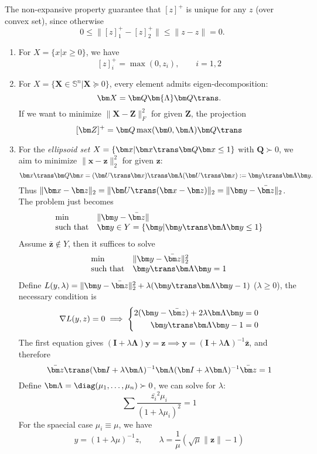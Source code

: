 The non-expansive property guarantee that $[z]^+$ is unique for any $z$ (over convex set), since otherwise
\[
0\le\|[z]^+_1-[z]^+_2\|\le\|z-z\|=0.
\]
\begin{example}
\begin{enumerate}
\item
For $X=\{x|x\ge0\}$, we have
\[
[z]^+_i=\max(0,z_i),\qquad i=1,2
\]
\item
For $X=\{\bm X\in\mathbb{S}^n|\bm X\succeq0\}$, every element admits eigen-decomposition:
\[
\bm X=\bm Q\bm{\Lambda}\bm Q\trans.
\]
If we want to minimize $\|\bm X-\bm Z\|_F^2$ for given $\bm Z$, the projection
\[
[\bm Z]^+=\bm Q\max(\bm0,\bm\Lambda)\bm Q\trans
\]
\item
For the \emph{ellipsoid set} $X=\{\bm x|\bm x\trans\bm Q\bm x\le1\}$ with $\bm Q\succ0$, we aim to minimize $\|\bm x-\bm z\|_2^2$ for given $\bm z$:
\[
\bm x\trans\bm Q\bm x=(\bm U\trans\bm x)\trans\bm\Lambda(\bm U\trans\bm x):=\bm y\trans\bm\Lambda\bm y.
\]
Thus $\|\bm x-\bm z\|_2=\|\bm U\trans(\bm x-\bm z)\|_2=\|\bm y-\bar{\bm z}\|_2$. The problem just becomes
\[
\begin{array}{ll}
\min&\|\bm y-\bar{\bm z}\|\\
\mbox{such that}&\bm y\in Y=\{\bm y|\bm y\trans\bm\Lambda\bm y\le1\}
\end{array}
\]
Assume $\bar{\bm z}\notin Y$, then it suffices to solve
\[
\begin{array}{ll}
\min&\|\bm y-\bar{\bm z}\|_2^2\\
\mbox{such that}&\bm y\trans\bm\Lambda\bm y=1
\end{array}
\]
Define $L(y,\lambda)=\|\bm y-\bar{\bm z}\|_2^2+\lambda(\bm y\trans\bm\Lambda\bm y-1)$ ($\lambda\ge0$), the necessary condition is
\[
\nabla L(y,z)=0\implies
\left\{
\begin{aligned}
2(\bm y-\bar{\bm z})+2\lambda\bm\Lambda\bm y&=0\\
\bm y\trans\bm\Lambda\bm y-1&=0
\end{aligned}
\right.
\]
The first equation gives $(\bm I+\lambda\bm\Lambda)\bm y=\bm z\implies\bm y=(\bm I+\lambda\bm\Lambda)^{-1}\bar{\bm z}$, and therefore
\[
\bar{\bm z}\trans(\bm I+\lambda\bm\Lambda)^{-1}\bm\Lambda(\bm I+\lambda\bm\Lambda)^{-1}\bar{\bm z}=1
\]
Define $\bm\Lambda=\diag(\mu_1,\dots,\mu_n)\succ0$, we can solve for $\lambda$:
\[
\sum\frac{\bar{z_i}^2\mu_i}{(1+\lambda\mu_i)^2}=1
\]
For the spaecial case $\mu_i\equiv\mu$, we have
\[
y=(1+\lambda\mu)^{-1}z,\qquad
\lambda=\frac{1}{\mu}(\sqrt{\mu}\|\bm z\|-1)
\]
\end{enumerate}
\end{example}
